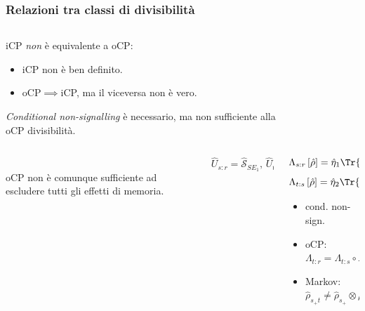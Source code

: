 \documentclass{beamer}
\begin{document}
\begin{frame}
\frametitle{Relazioni tra classi di divisibilità}
\begin{columns}
	\begin{column}{0.68\textwidth}
		iCP \emph{non} è equivalente a oCP:
		\begin{itemize}
			\item<1->  iCP non è ben definito.
			\item<2->  oCP\(\implies\)iCP, ma il viceversa non è vero.
		\end{itemize}
	\pause
	\emph{Conditional non-signalling} è necessario, ma non sufficiente alla oCP divisibilità.
	\end{column}
    \pause
	\begin{column}{0.30\textwidth}
		\begin{figure}
			\resizebox{\textwidth}{!}{}
		\end{figure}
	\end{column}
\end{columns}
\begin{columns}
	\begin{column}{0.3\textwidth}
		\\
		oCP non  è comunque sufficiente ad escludere tutti gli effetti di memoria.
	\end{column}
    \pause
	\begin{column}{0.3\textwidth}
		\begin{figure}
			\resizebox{\textwidth}{!}{}
		\end{figure}
	    \[\hat{U}_{s:r} = \hat{\mathcal{S}}_{S E_1},\, \hat{U}_{t:s} = \hat{\mathcal{S}}_{S E_2}\]
	\end{column}
    \pause
    \begin{column}{0.4\textwidth}
    	\[\Lambda_{s:r}\left[\hat{\rho}\right] = \hat{\eta}_1 \Tr{\hat{\rho}},\]
    	\[\Lambda_{t:s}\left[\hat{\rho}\right] = \hat{\eta}_2 \Tr{\hat{\rho}}  \]
    	\begin{itemize}[label={\checkmark}]
    		\item cond. non-sign.
    		\item oCP: \(\Lambda_{t\colon r} = \Lambda_{t\colon s} \circ \Lambda_{s\colon r}\)
    	\end{itemize}
	    \begin{itemize}[label={\(\times\)}]
	    	\item Markov: \(\hat{\rho}_{s_+t} \not= \hat{\rho}_{s_+} \otimes \hat{\rho}_{t}\)
	    \end{itemize}
    \end{column}
\end{columns}
\end{frame}
\end{document}
